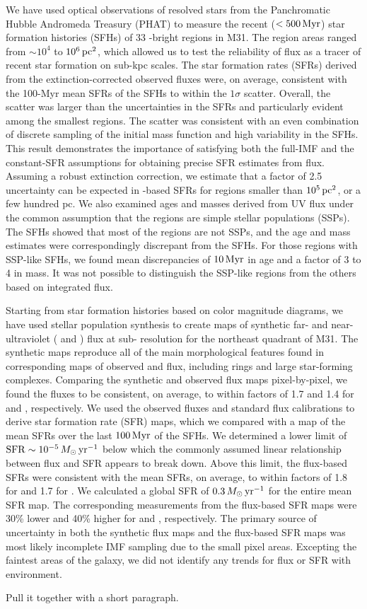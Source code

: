 We have used optical observations of resolved stars from the Panchromatic
Hubble Andromeda Treasury (PHAT) to measure the recent ($< 500\,\mathrm{Myr}$) star
formation histories (SFHs) of 33 \fuv{}-bright regions in M31. The region areas
ranged from $\sim 10^4$ to $10^6\,\mathrm{pc}^2$, which allowed us to test the
reliability of \fuv{} flux as a tracer of recent star formation on sub-kpc
scales. The star formation rates (SFRs) derived from the extinction-corrected
observed \fuv{} fluxes were, on average, consistent with the 100-Myr mean SFRs
of the SFHs to within the $1\sigma$ scatter. Overall, the scatter was larger
than the uncertainties in the SFRs and particularly evident among the smallest
regions. The scatter was consistent with an even combination of discrete
sampling of the initial mass function and high variability in the SFHs. This
result demonstrates the importance of satisfying both the full-IMF and the
constant-SFR assumptions for obtaining precise SFR estimates from \fuv{} flux.
Assuming a robust \fuv{} extinction correction, we estimate that a factor of
2.5 uncertainty can be expected in \fuv{}-based SFRs for regions smaller than
$10^5\,\mathrm{pc}^2$, or a few hundred pc. We also examined ages and masses derived from
UV flux under the common assumption that the regions are simple stellar
populations (SSPs). The SFHs showed that most of the regions are not SSPs, and
the age and mass estimates were correspondingly discrepant from the SFHs. For
those regions with SSP-like SFHs, we found mean discrepancies of $10\,\mathrm{Myr}$ in
age and a factor of 3 to 4 in mass. It was not possible to distinguish the
SSP-like regions from the others based on integrated \fuv{} flux.

Starting from star formation histories based on color magnitude diagrams, we
have used stellar population synthesis to create maps of synthetic far- and
near-ultraviolet (\fuv{} and \nuv{}) flux at sub-\kpc{} resolution for the
northeast quadrant of M31. The synthetic maps reproduce all of the main
morphological features found in corresponding maps of observed \fuv{} and
\nuv{} flux, including rings and large star-forming complexes. Comparing the
synthetic and observed flux maps pixel-by-pixel, we found the fluxes to be
consistent, on average, to within factors of 1.7 and 1.4 for \fuv{} and \nuv{},
respectively. We used the observed fluxes and standard flux calibrations to
derive star formation rate (SFR) maps, which we compared with a map of the mean
SFRs over the last $100\,\mathrm{Myr}$ of the SFHs. We determined a lower limit of $\mathrm{SFR}
\sim 10^{-5}\,M_\odot\,\mathrm{yr}^{-1}$ below which the commonly assumed linear relationship
between flux and SFR appears to break down. Above this limit, the flux-based
SFRs were consistent with the mean SFRs, on average, to within factors of 1.8
for \fuv{} and 1.7 for \nuv{}. We calculated a global SFR of $0.3\,M_\odot\,\mathrm{yr}^{-1}$
for the entire mean SFR map. The corresponding measurements from the flux-based
SFR maps were 30\% lower and 40\% higher for \fuv{} and \nuv{}, respectively.
The primary source of uncertainty in both the synthetic flux maps and the
flux-based SFR maps was most likely incomplete IMF sampling due to the small
pixel areas. Excepting the faintest areas of the galaxy, we did not identify
any trends for flux or SFR with environment.

Pull it together with a short paragraph.
